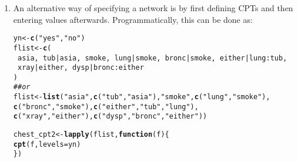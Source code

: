 \documentclass[10pt]{article}\usepackage[]{graphicx}\usepackage[]{xcolor}
\makeatletter
\newcommand{\hlstr}[1]{\textcolor[rgb]{0.192,0.494,0.8}{#1}}%
\newcommand{\hlcom}[1]{\textcolor[rgb]{0.678,0.584,0.686}{\textit{#1}}}%
\newcommand{\hlopt}[1]{\textcolor[rgb]{0,0,0}{#1}}%
\newcommand{\hlstd}[1]{\textcolor[rgb]{0.345,0.345,0.345}{#1}}%
\newcommand{\hlkwa}[1]{\textcolor[rgb]{0.161,0.373,0.58}{\textbf{#1}}}%
\newcommand{\hlkwb}[1]{\textcolor[rgb]{0.69,0.353,0.396}{#1}}%
\newcommand{\hlkwc}[1]{\textcolor[rgb]{0.333,0.667,0.333}{#1}}%
\newcommand{\hlkwd}[1]{\textcolor[rgb]{0.737,0.353,0.396}{\textbf{#1}}}%
\newenvironment{kframe}{%
 \def\at@end@of@kframe{}%
 \ifinner\ifhmode%
  \def\at@end@of@kframe{\end{minipage}}%
  \begin{minipage}{\columnwidth}%
 \fi\fi%
 \def\FrameCommand##1{\hskip\@totalleftmargin \hskip-\fboxsep
 \colorbox{shadecolor}{##1}\hskip-\fboxsep
     \hskip-\linewidth \hskip-\@totalleftmargin \hskip\columnwidth}%
 \MakeFramed {\advance\hsize-\width
   \@totalleftmargin\z@ \linewidth\hsize
   \@setminipage}}%
 {\par\unskip\endMakeFramed%
 \at@end@of@kframe}
\newenvironment{knitrout}{}{} %
\makeatother
\begin{document}
\begin{enumerate}
\item An alternative way of specifying a network is by first defining CPTs and then entering values afterwards. Programmatically, this can be done as:

\begin{knitrout}
\color{fgcolor}\begin{kframe}
\begin{alltt}
\hlstd{yn} \hlkwb{<-} \hlkwd{c}\hlstd{(}\hlstr{"yes"}\hlstd{,}\hlstr{"no"}\hlstd{)}
\hlstd{flist} \hlkwb{<-} \hlkwd{c}\hlstd{(}
    \hlopt{~}\hlstd{asia,} \hlopt{~}\hlstd{tub}\hlopt{|}\hlstd{asia,} \hlopt{~}\hlstd{smoke,} \hlopt{~}\hlstd{lung}\hlopt{|}\hlstd{smoke,} \hlopt{~}\hlstd{bronc}\hlopt{|}\hlstd{smoke,} \hlopt{~}\hlstd{either}\hlopt{|}\hlstd{lung}\hlopt{:}\hlstd{tub,}
    \hlopt{~}\hlstd{xray}\hlopt{|}\hlstd{either,} \hlopt{~}\hlstd{dysp}\hlopt{|}\hlstd{bronc}\hlopt{:}\hlstd{either}
\hlstd{)}
\hlcom{## or}
\hlstd{flist} \hlkwb{<-} \hlkwd{list}\hlstd{(}\hlstr{"asia"}\hlstd{,} \hlkwd{c}\hlstd{(}\hlstr{"tub"}\hlstd{,} \hlstr{"asia"}\hlstd{),} \hlstr{"smoke"}\hlstd{,} \hlkwd{c}\hlstd{(}\hlstr{"lung"}\hlstd{,} \hlstr{"smoke"}\hlstd{),}
              \hlkwd{c}\hlstd{(}\hlstr{"bronc"}\hlstd{,} \hlstr{"smoke"}\hlstd{),} \hlkwd{c}\hlstd{(}\hlstr{"either"}\hlstd{,} \hlstr{"tub"}\hlstd{,} \hlstr{"lung"}\hlstd{),}
              \hlkwd{c}\hlstd{(}\hlstr{"xray"}\hlstd{,} \hlstr{"either"}\hlstd{),} \hlkwd{c}\hlstd{(}\hlstr{"dysp"}\hlstd{,} \hlstr{"bronc"}\hlstd{,} \hlstr{"either"}\hlstd{))}

\hlstd{chest_cpt2} \hlkwb{<-} \hlkwd{lapply}\hlstd{(flist,} \hlkwa{function}\hlstd{(}\hlkwc{f}\hlstd{)\{}
    \hlkwd{cpt}\hlstd{(f,} \hlkwc{levels}\hlstd{=yn)}
\hlstd{\})}


\end{alltt}
\end{kframe}
\end{knitrout}
\end{enumerate}
\end{document}
